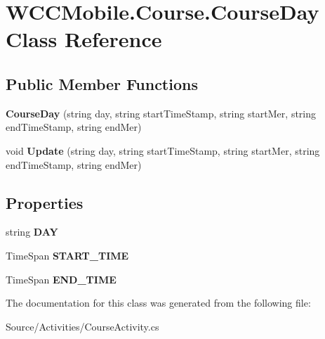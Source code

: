 \hypertarget{class_w_c_c_mobile_1_1_course_1_1_course_day}{}\section{W\+C\+C\+Mobile.\+Course.\+Course\+Day Class Reference}
\label{class_w_c_c_mobile_1_1_course_1_1_course_day}
\subsection*{Public Member Functions}
\begin{DoxyCompactItemize}
\item 
{\bfseries Course\+Day} (string day, string start\+Time\+Stamp, string start\+Mer, string end\+Time\+Stamp, string end\+Mer)\hypertarget{class_w_c_c_mobile_1_1_course_1_1_course_day_a67d05ee4d3adf8109f948a421618786c}{}\label{class_w_c_c_mobile_1_1_course_1_1_course_day_a67d05ee4d3adf8109f948a421618786c}

\item 
void {\bfseries Update} (string day, string start\+Time\+Stamp, string start\+Mer, string end\+Time\+Stamp, string end\+Mer)\hypertarget{class_w_c_c_mobile_1_1_course_1_1_course_day_afc1f017708bc8412fe886f9902339a14}{}\label{class_w_c_c_mobile_1_1_course_1_1_course_day_afc1f017708bc8412fe886f9902339a14}

\end{DoxyCompactItemize}
\subsection*{Properties}
\begin{DoxyCompactItemize}
\item 
string {\bfseries D\+AY}\hypertarget{class_w_c_c_mobile_1_1_course_1_1_course_day_a1174d20f23091bde693b7990d26245f4}{}\label{class_w_c_c_mobile_1_1_course_1_1_course_day_a1174d20f23091bde693b7990d26245f4}

\item 
Time\+Span {\bfseries S\+T\+A\+R\+T\+\_\+\+T\+I\+ME}\hypertarget{class_w_c_c_mobile_1_1_course_1_1_course_day_a60c185be582a6b10ad5c15045d3fdb1f}{}\label{class_w_c_c_mobile_1_1_course_1_1_course_day_a60c185be582a6b10ad5c15045d3fdb1f}

\item 
Time\+Span {\bfseries E\+N\+D\+\_\+\+T\+I\+ME}\hypertarget{class_w_c_c_mobile_1_1_course_1_1_course_day_a549d55a789ac8a7b0fa26f7ba6df4718}{}\label{class_w_c_c_mobile_1_1_course_1_1_course_day_a549d55a789ac8a7b0fa26f7ba6df4718}

\end{DoxyCompactItemize}


The documentation for this class was generated from the following file\+:\begin{DoxyCompactItemize}
\item 
Source/\+Activities/Course\+Activity.\+cs\end{DoxyCompactItemize}
